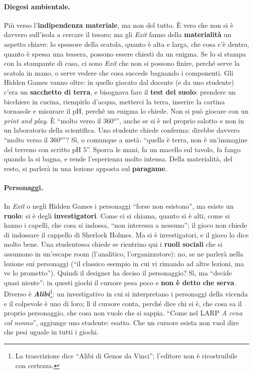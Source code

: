 \paragraph{Diegesi ambientale.} Più verso l'\textbf{indipendenza materiale}, ma
non del tutto. È vero che non si è davvero sull'isola a cercare il tesoro; ma gli
\emph{Exit} fanno della \textbf{materialità} un aspetto chiave: lo spessore della
scatola, quanto è alta e larga, che cosa c'è dentro, quanto è spessa una
tessera, possono essere chiesti da un enigma. Se lo si stampa con la stampante di
casa, ci sono \emph{Exit} che non si possono finire, perché serve la scatola in
mano, o serve vedere che cosa succede bagnando i componenti. Gli Hidden Games
vanno oltre: in quello giocato dal docente (e da uno studente) c'era un
\textbf{sacchetto di terra}, e bisognava fare il \textbf{test del suolo}: prendere
un bicchiere in cucina, riempirlo d'acqua, metterci la terra, inserire la cartina
tornasole e misurare il pH, perché un enigma lo chiede. Non si può giocare con un
\emph{print and play}. È ``molto verso il 360°'', anche se si è nel proprio
salotto e non in un laboratorio della scientifica. Uno studente chiede conferma:
direbbe davvero ``molto verso il 360°''? Sì, o comunque a metà: ``quella è terra,
non è un'immagine del terreno con scritto pH 5''. Sporca le mani, fa un macello
sul tavolo, fa fango quando la si bagna, e rende l'esperienza molto intensa. Della
materialità, del resto, si parlerà in una lezione apposta sul \textbf{paragame}.

\paragraph{Personaggi.} In \emph{Exit} o negli Hidden Games i personaggi ``forse
non esistono'', ma esiste un \textbf{ruolo}: si è degli \textbf{investigatori}.
Come ci si chiama, quanto si è alti, come si hanno i capelli, che cosa si indossa,
``non interessa a nessuno''; il gioco non chiede di indossare il cappello di
Sherlock Holmes. Ma si è investigatori, e il gioco lo dice molto bene. Una
studentessa chiede se rientrino qui i \textbf{ruoli sociali} che si assumono in
un'escape room (l'analitico, l'organizzatore): no, se ne parlerà nella lezione
sui personaggi (``il classico esempio in cui vi rimando ad altre lezioni, ma ve lo
prometto''). Quindi il designer ha deciso il personaggio? Sì, ma ``decide quasi
niente'': in questi giochi il cursore pesa poco e \textbf{non è detto che serva}.
Diverso è \textbf{\emph{Alibi}}\footnote{La trascrizione dice ``Alibi di Genos
da Vinci''; l'editore non è ricostruibile con certezza.}: un investigativo in cui
si interpretano i personaggi della vicenda e il colpevole è uno di loro; lì il
cursore conta, perché dice chi si è, che cosa sa il proprio personaggio, che cosa
non vuole che si sappia. ``Come nel LARP \emph{A cena col nonno}'', aggiunge uno
studente: esatto. Che un cursore esista non vuol dire che pesi uguale in tutti i
giochi.

